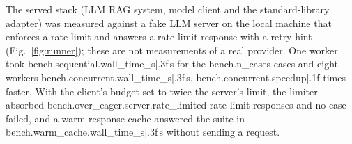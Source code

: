 The served stack (LLM RAG system, model client and the standard-library
adapter) was measured against a fake LLM server on the local machine that
enforces a rate limit and answers a rate-limit response with a retry hint
(Fig.~\ref{fig:runner}); these are not measurements of a real provider. One
worker took {{bench.sequential.wall_time_s|.3f}}\,s for the {{bench.n_cases}} cases and eight workers
{{bench.concurrent.wall_time_s|.3f}}\,s, {{bench.concurrent.speedup|.1f}} times faster. With the client's budget set to twice the
server's limit, the limiter absorbed {{bench.over_eager.server.rate_limited}} rate-limit responses and no case
failed, and a warm response cache answered the suite in {{bench.warm_cache.wall_time_s|.3f}}\,s without
sending a request.
